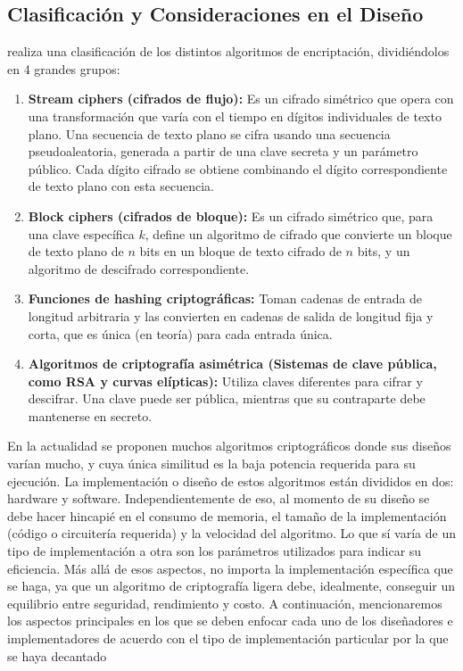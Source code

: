 \documentclass[a4paper,10pt]{article}
\begin{document}
	\subsection{Clasificación y Consideraciones en el Diseño}
	\label{sec:clas_consDiseño}
	\textcite{wehbe2022criptografia} realiza una clasificación de los distintos algoritmos de encriptación, dividiéndolos en 4 grandes grupos:
	\begin{enumerate}
		\item \textbf{Stream ciphers (cifrados de flujo): }Es un cifrado simétrico que opera con una transformación que varía con el tiempo en dígitos individuales de texto plano. Una secuencia de texto plano se cifra usando una secuencia pseudoaleatoria, generada a partir de una clave secreta y un parámetro público. Cada dígito cifrado se obtiene combinando el dígito correspondiente de texto plano con esta secuencia.
		\item \textbf{Block ciphers (cifrados de bloque):} Es un cifrado simétrico que, para una clave específica $k$, define un algoritmo de cifrado que convierte un bloque de texto plano de $n$ bits en un bloque de texto cifrado de $n$ bits, y un algoritmo de descifrado correspondiente.
		\item \textbf{Funciones de hashing criptográficas: }Toman cadenas de entrada de longitud arbitraria y las convierten en cadenas de salida de longitud fija y corta, que es única (en teoría) para cada entrada única.
		\item \textbf{Algoritmos de criptografía asimétrica (Sistemas de clave pública, como RSA y curvas elípticas): }Utiliza claves diferentes para cifrar y descifrar. Una clave puede ser pública, mientras que su contraparte debe mantenerse en secreto.
	\end{enumerate}
	En la actualidad se proponen muchos algoritmos criptográficos donde sus diseños varían mucho, y cuya única similitud es la baja potencia requerida para su ejecución. La implementación o diseño de estos algoritmos están divididos en dos: hardware y software. Independientemente de eso, al momento de su diseño se debe hacer hincapié en el consumo de memoria, el tamaño de la implementación (código o circuitería requerida) y la velocidad del algoritmo. Lo que sí varía de un tipo de implementación a otra son los parámetros utilizados para indicar su eficiencia. Más allá de esos aspectos, no importa la implementación específica que se haga, ya que un algoritmo de criptografía ligera debe, idealmente, conseguir un equilibrio entre seguridad, rendimiento y costo. A continuación, mencionaremos los aspectos principales en los que se deben enfocar cada uno de los diseñadores e implementadores de acuerdo con el tipo de implementación particular por la que se haya decantado
	
\end{document}
